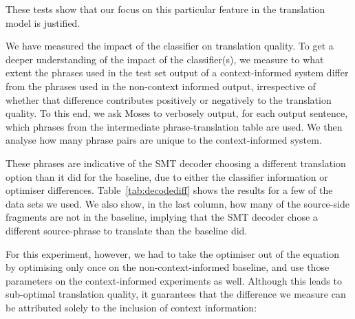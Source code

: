 These tests show that our focus on this particular feature in the
translation model is justified.


We have measured the impact of the classifier on translation quality.  To get a
deeper understanding of the impact of the classifier(s), we measure to what
extent the phrases used in the test set output of a context-informed system
differ from the phrases used in the non-context informed output, irrespective
of whether that difference contributes positively or negatively to the
translation quality. To this end, we ask Moses to verbosely output, for each
output sentence, which phrases from the intermediate phrase-translation table
are used. We then analyse how many phrase pairs are unique to the
context-informed system.

These phrases are indicative of the SMT decoder
choosing a different translation option than it did for the baseline, due to
either the classifier information or optimiser differences.
Table~\ref{tab:decodediff} shows the results for a few of the data sets we
used. We also show, in the last column, how many of the source-side fragments
are not in the baseline, implying that the SMT decoder chose a different
source-phrase to translate than the baseline did.

For this experiment, however, we had to take the optimiser out of the equation
by optimising only once on the non-context-informed baseline, and use those
parameters on the context-informed experiments as well. Although this leads to
sub-optimal translation quality, it guarantees that the difference we measure
can be attributed solely to the inclusion of context information:


